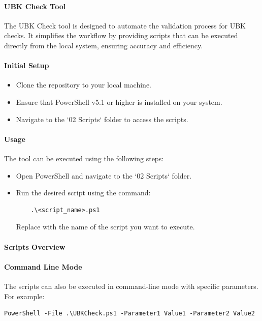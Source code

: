 \documentclass[11pt,headings=small]{scrartcl}
\begin{document}
\twocolumn

\paragraph{UBK Check Tool}
The UBK Check tool is designed to automate the validation process for UBK checks. It simplifies the workflow by providing scripts that can be executed directly from the local system, ensuring accuracy and efficiency.

\paragraph{Initial Setup}
\begin{itemize}
    \item Clone the repository to your local machine.
    \item Ensure that PowerShell v5.1 or higher is installed on your system.
    \item Navigate to the `02 Scripts` folder to access the scripts.
\end{itemize}

\paragraph{Usage}
The tool can be executed using the following steps:
\begin{itemize}
    \item Open PowerShell and navigate to the `02 Scripts` folder.
    \item Run the desired script using the command:
    \begin{verbatim}
    .\<script_name>.ps1
    \end{verbatim}
    Replace  with the name of the script you want to execute.
\end{itemize}

\paragraph{Scripts Overview}


\paragraph{Command Line Mode}
The scripts can also be executed in command-line mode with specific parameters. For example:
\begin{verbatim}
PowerShell -File .\UBKCheck.ps1 -Parameter1 Value1 -Parameter2 Value2
\end{verbatim}
\end{document}
